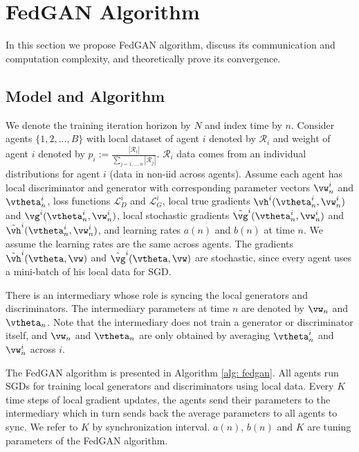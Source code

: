 \documentclass{article}
\begin{document}
\section{FedGAN Algorithm}
In this section we propose FedGAN algorithm, discuss its communication and computation complexity, and theoretically prove its convergence.

\subsection{Model and Algorithm}
\label{sec:algo}
We denote the training iteration horizon by $N$ and index time by $n$. Consider agents $\{1,2,..., B\}$  with local dataset of agent $i$ denoted by $\mathcal{R}_i$ and weight of  agent $i$ denoted by $p_i:=\frac{|\mathcal{R}_i|}{\sum_{j=1,...,n} |\mathcal{R}_j|}$.  $\mathcal{R}_i$ data comes from an individual distributions for agent $i$ (data in non-iid across agents). Assume each agent has local discriminator and generator with corresponding parameter vectors $\vw_n^i$ and $\vtheta_n^i$, loss functions $\mathcal{L}^i_D$ and $\mathcal{L}^i_G$, local true gradients $\vh^i(\vtheta^i_n, \vw^i_n)$  and $\vg^i(\vtheta^i_n, \vw^i_n)$, local stochastic gradients $\tilde{\vg}^i(\vtheta^i_n, \vw^i_n)$ and $\tilde{\vh}^i(\vtheta^i_n, \vw^i_n)$, and learning rates $a(n)$ and $b(n)$ at time $n$. We assume the learning rates are the same across agents. The gradients $\tilde{\vh}^i(\vtheta, \vw)$ and $\tilde{\vg}^i(\vtheta, \vw)$ are stochastic, since every agent uses a mini-batch of his local data for SGD.

There is an intermediary whose role is syncing the local generators and discriminators. The intermediary parameters at time $n$ are denoted by $\vw_n$ and $\vtheta_n$. Note that the intermediary does not train a generator or discriminator itself, and $\vw_n$ and $\vtheta_n$ are only obtained by averaging $\vtheta^i_n$ and $\vw^i_n$ across $i$.


The FedGAN algorithm is presented in Algorithm \ref{alg: fedgan}. All agents run SGDs for training local generators and discriminators using local data. Every $K$ time steps of local gradient updates, the agents send their parameters to the intermediary which in turn sends back the average parameters to all agents to sync. We refer to $K$ by synchronization interval. $a(n)$, $b(n)$ and  $K$ are tuning parameters of the FedGAN algorithm.
\end{document}
